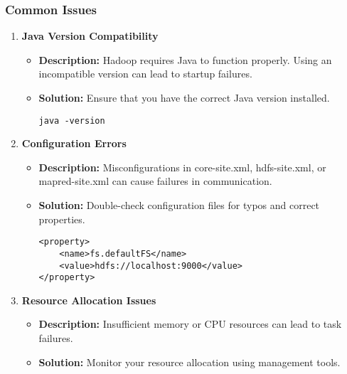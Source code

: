 \documentclass{beamer}
\begin{document}
\begin{frame}[fragile]
    \frametitle{Common Issues}
    \begin{enumerate}
        \item \textbf{Java Version Compatibility}
            \begin{itemize}
                \item \textbf{Description:} Hadoop requires Java to function properly. 
                Using an incompatible version can lead to startup failures.
                \item \textbf{Solution:} Ensure that you have the correct Java version installed.
                \begin{lstlisting}
java -version
                \end{lstlisting}
            \end{itemize}

        \item \textbf{Configuration Errors}
            \begin{itemize}
                \item \textbf{Description:} Misconfigurations in core-site.xml, 
                hdfs-site.xml, or mapred-site.xml can cause failures in communication.
                \item \textbf{Solution:} Double-check configuration files for typos and correct properties.
                \begin{lstlisting}
<property>
    <name>fs.defaultFS</name>
    <value>hdfs://localhost:9000</value>
</property>
                \end{lstlisting}
            \end{itemize}

        \item \textbf{Resource Allocation Issues}
            \begin{itemize}
                \item \textbf{Description:} Insufficient memory or CPU resources 
                can lead to task failures.
                \item \textbf{Solution:} Monitor your resource allocation using management tools.
            \end{itemize}
    \end{enumerate}
\end{frame}
\end{document}
